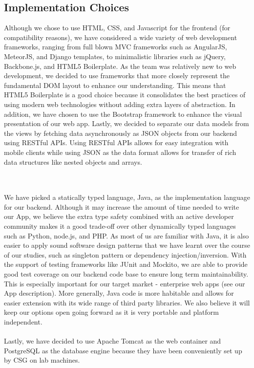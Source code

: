 \documentclass[10pt,a4paper]{article}
\begin{document}
\subsection{Implementation Choices}

Although we chose to use HTML, CSS, and Javascript for the frontend (for compatibility reasons), we have considered a wide variety of web development frameworks, ranging from full blown MVC frameworks such as AngularJS, MeteorJS, and Django templates, to minimalistic libraries such as jQuery, Backbone.js, and HTML5 Boilerplate. As the team was relatively new to web development, we decided to use frameworks that more closely represent the fundamental DOM layout to enhance our understanding. This means that HTML5 Boilerplate is a good choice because it consolidates the best practices of using modern web technologies without adding extra layers of abstraction. In addition, we have chosen to use the Bootstrap framework to enhance the visual presentation of our web app. Lastly, we decided to separate our data models from the views by fetching data asynchronously as JSON objects from our backend using RESTful APIs. Using RESTful APIs allows for easy integration with mobile clients while using JSON as the data format allows for transfer of rich data structures like nested objects and arrays.

\\
\\
\noindent
We have picked a statically typed language, Java, as the implementation language for our backend. Although it may increase the amount of time needed to write our App, we believe the extra type safety combined with an active developer community makes it a good trade-off over other dynamically typed languages such as Python, node.js, and PHP. As most of us are familiar with Java, it is also easier to apply sound software design patterns that we have learnt over the course of our studies, such as singleton pattern or dependency injection/inversion. With the support of testing frameworks like JUnit and Mockito, we are able to provide good test coverage on our backend code base to ensure long term maintainability. This is especially important for our target market - enterprise web apps (see our App description). More generally, Java code is more habitable and allows for easier extension with its wide range of third party libraries. We also believe it will keep our options open going forward as it is very portable and platform independent.
\\
\\
\noindent
Lastly, we have decided to use Apache Tomcat as the web container and PostgreSQL as the database engine because they have been conveniently set up by CSG on lab machines.
\end{document}
